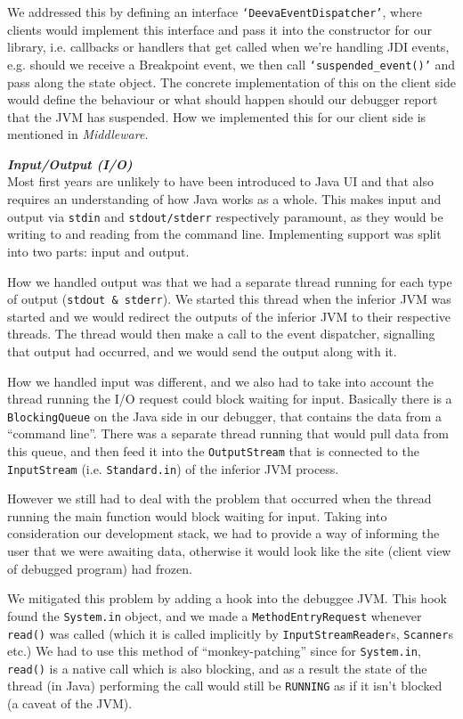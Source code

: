\documentclass[11pt, a4paper]{article}
\begin{document}
We addressed this by defining an interface \texttt{`DeevaEventDispatcher'}, where clients would implement this interface and pass it into the constructor for our library, i.e. callbacks or handlers that get called when we're handling JDI events, e.g. should we receive a Breakpoint event, we then call \texttt{`suspended\_event()'} and pass along the state object.
The concrete implementation of this on the client side would define the behaviour or what should happen should our debugger report that the JVM has suspended.
How we implemented this for our client side is mentioned in \emph{Middleware}.

\textbf{\emph{Input/Output (I/O)}}\\
Most first years are unlikely to have been introduced to Java UI and that also requires an understanding of how Java works as a whole.
This makes input and output via \texttt{stdin} and \texttt{stdout/stderr} respectively paramount, as they would be writing to and reading from the command line.
Implementing support was split into two parts: input and output.

How we handled output was that we had a separate thread running for each type of output (\texttt{stdout \& stderr}). We started this thread when the inferior JVM was started and we would redirect the outputs of the inferior JVM to their respective threads.
The thread would then make a call to the event dispatcher, signalling that output had occurred, and we would send the output along with it.

How we handled input was different, and we also had to take into account the thread running the I/O request could block waiting for input.
Basically there is a \texttt{BlockingQueue} on the Java side in our debugger, that contains the data from a ``command line''.
There was a separate thread running that would pull data from this queue, and then feed it into the \texttt{OutputStream} that is connected to the \texttt{InputStream} (i.e. \texttt{Standard.in}) of the inferior JVM process.

However we still had to deal with the problem that occurred when the thread running the main function would block waiting for input.
Taking into consideration our development stack, we had to provide a way of informing the user that we were awaiting data, otherwise it would look like the site (client view of debugged program) had frozen.

We mitigated this problem by adding a hook into the debuggee JVM.
This hook found the \texttt{System.in} object, and we made a \texttt{MethodEntryRequest} whenever \texttt{read()} was called (which it is called implicitly by \texttt{InputStreamReader}s, \texttt{Scanner}s etc.)
We had to use this method of ``monkey-patching'' since for \texttt{System.in}, \texttt{read()} is a native call which is also blocking, and as a result the state of the thread (in Java) performing the call would still be \texttt{RUNNING} as if it isn't blocked (a caveat of the JVM).
\end{document}

